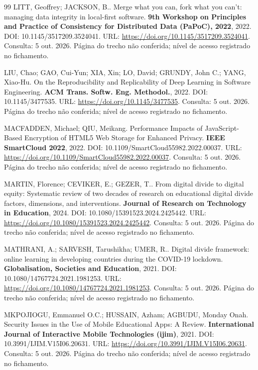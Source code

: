 \begin{thebibliography}{99}
 LITT, Geoffrey; JACKSON, B.. Merge what you can, fork what you can't: managing data integrity in local-first software. \textbf{9th Workshop on Principles and Practice of Consistency for Distributed Data (PaPoC), 2022}, 2022. DOI: 10.1145/3517209.3524041. URL: \url{https://doi.org/10.1145/3517209.3524041}. Consulta: 5 out. 2026. Página do trecho não conferida; nível de acesso registrado no fichamento.


 LIU, Chao; GAO, Cui-Yun; XIA, Xin; LO, David; GRUNDY, John C.; YANG, Xiao-Hu. On the Reproducibility and Replicability of Deep Learning in Software Engineering. \textbf{ACM Trans. Softw. Eng. Methodol.}, 2022. DOI: 10.1145/3477535. URL: \url{https://doi.org/10.1145/3477535}. Consulta: 5 out. 2026. Página do trecho não conferida; nível de acesso registrado no fichamento.


 MACFADDEN, Michael; QIU, Meikang. Performance Impacts of JavaScript-Based Encryption of HTML5 Web Storage for Enhanced Privacy. \textbf{IEEE SmartCloud 2022}, 2022. DOI: 10.1109/SmartCloud55982.2022.00037. URL: \url{https://doi.org/10.1109/SmartCloud55982.2022.00037}. Consulta: 5 out. 2026. Página do trecho não conferida; nível de acesso registrado no fichamento.


 MARTIN, Florence; CEVIKER, E.; GEZER, T.. From digital divide to digital equity: Systematic review of two decades of research on educational digital divide factors, dimensions, and interventions. \textbf{Journal of Research on Technology in Education}, 2024. DOI: 10.1080/15391523.2024.2425442. URL: \url{https://doi.org/10.1080/15391523.2024.2425442}. Consulta: 5 out. 2026. Página do trecho não conferida; nível de acesso registrado no fichamento.


 MATHRANI, A.; SARVESH, Tarushikha; UMER, R.. Digital divide framework: online learning in developing countries during the COVID-19 lockdown. \textbf{Globalisation, Societies and Education}, 2021. DOI: 10.1080/14767724.2021.1981253. URL: \url{https://doi.org/10.1080/14767724.2021.1981253}. Consulta: 5 out. 2026. Página do trecho não conferida; nível de acesso registrado no fichamento.


 MKPOJIOGU, Emmanuel O.C.; HUSSAIN, Azham; AGBUDU, Monday Onah. Security Issues in the Use of Mobile Educational Apps: A Review. \textbf{International Journal of Interactive Mobile Technologies (ijim)}, 2021. DOI: 10.3991/IJIM.V15I06.20631. URL: \url{https://doi.org/10.3991/IJIM.V15I06.20631}. Consulta: 5 out. 2026. Página do trecho não conferida; nível de acesso registrado no fichamento.



\end{thebibliography}
